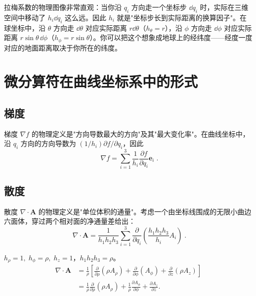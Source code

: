 \begin{insight}[拉梅系数 = 局部标尺]
拉梅系数的物理图像非常直观：当你沿 $q_i$ 方向走一个坐标步 $\dd q_i$ 时，实际在三维空间中移动了 $h_i\dd q_i$ 这么远。因此 $h_i$ 就是"坐标步长到实际距离的换算因子"。在球坐标中，沿 $\theta$ 方向走 $\dd\theta$ 对应实际距离 $r\dd\theta$（$h_\theta=r$），沿 $\phi$ 方向走 $\dd\phi$ 对应实际距离 $r\sin\theta\,\dd\phi$（$h_\phi=r\sin\theta$）。你可以把这个想象成地球上的经纬度——经度一度对应的地面距离取决于你所在的纬度。
\end{insight}

\section{微分算符在曲线坐标系中的形式}

\subsection{梯度}

梯度 $\nabla f$ 的物理定义是"方向导数最大的方向"及其"最大变化率"。在曲线坐标中，沿 $q_i$ 方向的方向导数为 $(1/h_i)\partial f/\partial q_i$，因此
\[
\boxed{\;\nabla f = \sum_{i=1}^3 \frac{1}{h_i}\frac{\partial f}{\partial q_i}\mathbf{e}_i\;}.
\label{eq:grad_curvilinear}
\]

\subsection{散度}

散度 $\nabla\cdot\mathbf{A}$ 的物理定义是"单位体积的通量"。考虑一个由坐标线围成的无限小曲边六面体，穿过两个相对面的净通量差给出：
\[
\boxed{\;
\nabla\cdot\mathbf{A}
= \frac{1}{h_1h_2h_3}\sum_{i=1}^3
\frac{\partial}{\partial q_i}\left(\frac{h_1h_2h_3}{h_i}A_i\right)
\;}.
\label{eq:div_curvilinear}
\]

\begin{example}[柱坐标中的散度]
$h_\rho=1,\;h_\phi=\rho,\;h_z=1$，$h_1h_2h_3 = \rho$。
\begin{align*}
\nabla\cdot\mathbf{A}
&= \frac{1}{\rho}\left[
\frac{\partial}{\partial\rho}(\rho A_\rho)
+ \frac{\partial}{\partial\phi}(A_\phi)
+ \frac{\partial}{\partial z}(\rho A_z)
\right] \\
&= \frac{1}{\rho}\frac{\partial}{\partial\rho}(\rho A_\rho)
+ \frac{1}{\rho}\frac{\partial A_\phi}{\partial\phi}
+ \frac{\partial A_z}{\partial z}.
\end{align*}
\end{example}

